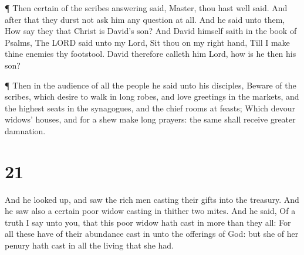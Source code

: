  ¶ Then certain of the scribes answering said, Master, thou
hast well said.  And after that they durst not ask him any
question at all.  And he said unto them, How say they that
Christ is David's son?  And David himself saith in the book
of Psalms, The LORD said unto my Lord, Sit thou on my right hand,
 Till I make thine enemies thy footstool. 
David therefore calleth him Lord, how is he then his son?

 ¶ Then in the audience of all the people he said unto his
disciples,  Beware of the scribes, which desire to walk in
long robes, and love greetings in the markets, and the highest seats in
the synagogues, and the chief rooms at feasts;  Which
devour widows' houses, and for a shew make long prayers: the same shall
receive greater damnation.

\hypertarget{section-20}{%
\section{21}\label{section-20}}

 And he looked up, and saw the rich men casting their gifts
into the treasury.  And he saw also a certain poor widow
casting in thither two mites.  And he said, Of a truth I say
unto you, that this poor widow hath cast in more than they all:
 For all these have of their abundance cast in unto the
offerings of God: but she of her penury hath cast in all the living that
she had.

